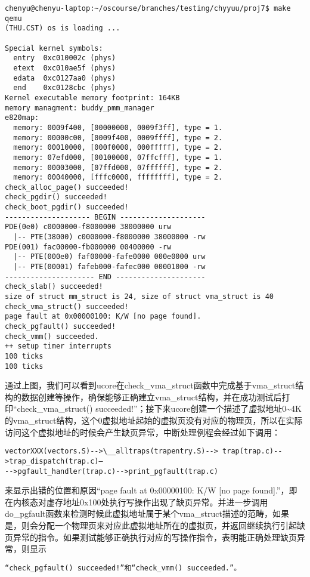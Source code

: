 \begin{lstlisting}
chenyu@chenyu-laptop:~/oscourse/branches/testing/chyyuu/proj7$ make qemu
(THU.CST) os is loading ...

Special kernel symbols:
  entry  0xc010002c (phys)
  etext  0xc010ae5f (phys)
  edata  0xc0127aa0 (phys)
  end    0xc0128cbc (phys)
Kernel executable memory footprint: 164KB
memory managment: buddy_pmm_manager
e820map:
  memory: 0009f400, [00000000, 0009f3ff], type = 1.
  memory: 00000c00, [0009f400, 0009ffff], type = 2.
  memory: 00010000, [000f0000, 000fffff], type = 2.
  memory: 07efd000, [00100000, 07ffcfff], type = 1.
  memory: 00003000, [07ffd000, 07ffffff], type = 2.
  memory: 00040000, [fffc0000, ffffffff], type = 2.
check_alloc_page() succeeded!
check_pgdir() succeeded!
check_boot_pgdir() succeeded!
-------------------- BEGIN --------------------
PDE(0e0) c0000000-f8000000 38000000 urw
  |-- PTE(38000) c0000000-f8000000 38000000 -rw
PDE(001) fac00000-fb000000 00400000 -rw
  |-- PTE(000e0) faf00000-fafe0000 000e0000 urw
  |-- PTE(00001) fafeb000-fafec000 00001000 -rw
--------------------- END ---------------------
check_slab() succeeded!
size of struct mm_struct is 24, size of struct vma_struct is 40
check_vma_struct() succeeded!
page fault at 0x00000100: K/W [no page found].
check_pgfault() succeeded!
check_vmm() succeeded.
++ setup timer interrupts
100 ticks
100 ticks
\end{lstlisting}

通过上图，我们可以看到ucore在check\_vma\_struct函数中完成基于vma\_struct结构的数据创建等操作，确保能够正确建立vma\_struct结构，并在成功测试后打印``check\_vma\_struct()
succeeded!''；接下来ucore创建一个描述了虚拟地址0\textasciitilde{}4K的vma\_struct结构，这个0虚拟地址起始的虚拟页没有对应的物理页，所以在实际访问这个虚拟地址的时候会产生缺页异常，中断处理例程会经过如下调用：

\begin{lstlisting}
vectorXXX(vectors.S)-->\__alltraps(trapentry.S)--> trap(trap.c)-->trap_dispatch(trap.c)—
-->pgfault_handler(trap.c)-->print_pgfault(trap.c)
\end{lstlisting}

来显示出错的位置和原因``page fault at 0x00000100: K/W {[}no page
found{]}.''，即在内核态对虚存地址0x100处执行写操作出现了缺页异常。并进一步调用do\_pgfault函数来检测时候此虚拟地址属于某个vma\_struct描述的范畴，如果是，则会分配一个物理页来对应此虚拟地址所在的虚拟页，并返回继续执行引起缺页异常的指令。如果测试能够正确执行对应的写操作指令，表明能正确处理缺页异常，则显示

\begin{lstlisting}
“check_pgfault() succeeded!”和“check_vmm() succeeded.”。
\end{lstlisting}

